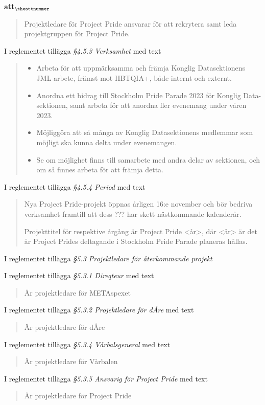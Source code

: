 \documentclass[a4paper]{article}
\begin{document}
\begin{list}{\bf att$_{\theattnummer}$}{}
\begin{quote}
        Projektledare för Project Pride ansvarar för att rekrytera samt leda projektgruppen
        för Project Pride.
    \end{quote}
\item I reglementet tillägga \textit{\S4.5.3 Verksamhet} med text
    \begin{quote}
        \begin{itemize}
            \item Arbeta för att uppmärksamma och främja Konglig Datasektionens JML-arbete, främst mot HBTQIA+, både internt och externt.
            \item Anordna ett bidrag till Stockholm Pride Parade 2023 för Konglig Data-sektionen, samt arbeta för att anordna fler evenemang under våren 2023.
            \item Möjliggöra att så många av Konglig Datasektionens medlemmar som möjligt ska kunna delta under evenemangen.
            \item Se om möjlighet finns till samarbete med andra delar av sektionen, och om så finnes arbeta för att främja detta.
        \end{itemize}
    \end{quote}
\item I reglementet tillägga \textit{\S4.5.4 Period} med text
    \begin{quote}
        Nya Project Pride-projekt öppnas årligen 16:e november och bör bedriva verksamhet framtill att dess ??? har skett nästkommande kalenderår.

        Projekttitel för respektive årgång är Project Pride <år>, där <år> är det år Project Prides deltagande i Stockholm Pride Parade planeras hållas.
    \end{quote}


\item I reglementet tillägga \textit{\S5.3 Projektledare för återkommande projekt}
\item I reglementet tillägga \textit{\S5.3.1 Direqteur} med text
    \begin{quote}
        Är projektledare för METAspexet
    \end{quote}
\item I reglementet tillägga \textit{\S5.3.2 Projektledare för dÅre} med text
    \begin{quote}
        Är projektledare för dÅre
    \end{quote}
\item I reglementet tillägga \textit{\S5.3.4 Vårbalsgeneral} med text
    \begin{quote}
        Är projektledare för Vårbalen
    \end{quote}
\item I reglementet tillägga \textit{\S5.3.5 Ansvarig för Project Pride} med text
    \begin{quote}
        Är projektledare för Project Pride
    \end{quote}


\end{list}
\end{document}
